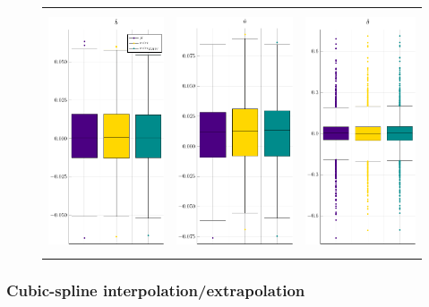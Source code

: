 \begin{figure}[h]
	\centering
	\begin{tabular}[b]{c c c}
		\includegraphics[height=270px,width=.30\textwidth]{Figures/1a/BIAS_b2.pdf} & \includegraphics[height=270px,width=.30\textwidth]{Figures/1a/BIAS_a.pdf} & \includegraphics[height=270px,width=.30\textwidth]{Figures/1a/BIAS_t.pdf}
	\end{tabular}
\end{figure}

\subsubsection{Cubic-spline interpolation/extrapolation}

